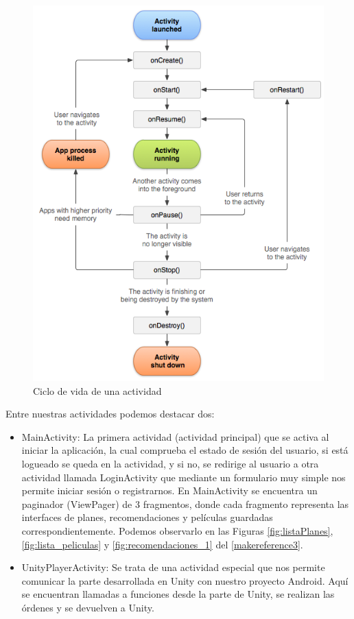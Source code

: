 \begin{figure}[H]
    \centering
    \includegraphics[width=5in]{figures/chapter-4/activity_lifecycle.png}
    \caption{Ciclo de vida de una actividad}
\end{figure}

Entre nuestras actividades podemos destacar dos: 
\begin{itemize}
    \item MainActivity: La primera actividad (actividad principal) que se activa al iniciar la aplicación, la cual comprueba el estado de sesión del usuario, si está logueado se queda en la actividad, y si no, se redirige al usuario a otra actividad llamada LoginActivity que mediante un formulario muy simple nos permite iniciar sesión o registrarnos. En MainActivity se encuentra un paginador (ViewPager) de 3 fragmentos, donde cada fragmento representa las interfaces de planes, recomendaciones y películas guardadas correspondientemente. Podemos observarlo en las Figuras \ref{fig:listaPlanes}, \ref{fig:lista_peliculas} y \ref{fig:recomendaciones_1} del \autoref{makereference3}.
    \item UnityPlayerActivity: Se trata de una actividad especial que nos permite comunicar la parte desarrollada en Unity con nuestro proyecto Android. Aquí se encuentran llamadas a funciones desde la parte de Unity, se realizan las órdenes y se devuelven a Unity.
\end{itemize} 

